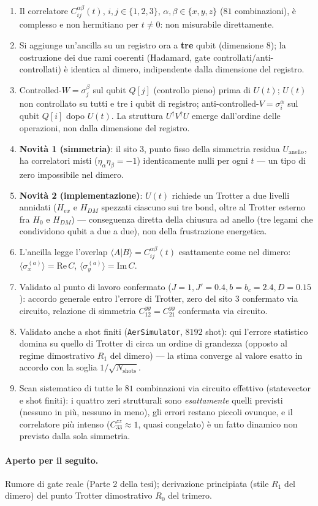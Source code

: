 \documentclass[11pt,a4paper]{article}
\begin{document}
\begin{enumerate}[leftmargin=*]
\item Il correlatore $C_{ij}^{\alpha\beta}(t)$, $i,j\in\{1,2,3\}$, $\alpha,\beta\in\{x,y,z\}$ ($81$
combinazioni), è complesso e non hermitiano per $t\neq0$: non misurabile direttamente.
\item Si aggiunge un'ancilla su un registro ora a \textbf{tre} qubit (dimensione $8$); la
costruzione dei due rami coerenti (Hadamard, gate controllati/anti-controllati) è identica al
dimero, indipendente dalla dimensione del registro.
\item Controlled-$W=\sigma_j^\beta$ sul qubit $Q[j]$ (controllo pieno) prima di $U(t)$;
$U(t)$ non controllato su tutti e tre i qubit di registro; anti-controlled-$V=\sigma_i^\alpha$ sul
qubit $Q[i]$ dopo $U(t)$. La struttura $U^\dagger V^\dagger U$ emerge dall'ordine delle operazioni,
non dalla dimensione del registro.
\item \textbf{Novità 1 (simmetria)}: il sito 3, punto fisso della simmetria residua
$U_\text{anello}$, ha correlatori misti ($\eta_\alpha\eta_\beta=-1$) identicamente nulli per ogni
$t$ --- un tipo di zero impossibile nel dimero.
\item \textbf{Novità 2 (implementazione)}: $U(t)$ richiede un Trotter a due livelli annidati
($H_{ex}$ e $H_{DM}$ spezzati ciascuno sui tre bond, oltre al Trotter esterno fra $H_0$ e
$H_{DM}$) --- conseguenza diretta della chiusura ad anello (tre legami che condividono qubit a due
a due), non della frustrazione energetica.
\item L'ancilla legge l'overlap $\langle A|B\rangle=C_{ij}^{\alpha\beta}(t)$ esattamente come nel
dimero: $\langle\sigma_x^{(a)}\rangle=\mathrm{Re}\,C$, $\langle\sigma_y^{(a)}\rangle=\mathrm{Im}\,C$.
\item Validato al punto di lavoro confermato ($J{=}1,J'{=}0.4,b{=}b_c{=}2.4,D{=}0.15$): accordo
generale entro l'errore di Trotter, zero del sito 3 confermato via circuito, relazione di
simmetria $C_{12}^{yy}=C_{21}^{yy}$ confermata via circuito.
\item Validato anche a shot finiti (\texttt{AerSimulator}, $8192$ shot): qui l'errore statistico
domina su quello di Trotter di circa un ordine di grandezza (opposto al regime dimostrativo
$R_1$ del dimero) --- la stima converge al valore esatto in accordo con la soglia
$1/\sqrt{N_{\text{shots}}}$.
\item Scan sistematico di tutte le $81$ combinazioni via circuito effettivo (statevector e shot
finiti): i quattro zeri strutturali sono \emph{esattamente} quelli previsti (nessuno in più,
nessuno in meno), gli errori restano piccoli ovunque, e il correlatore più intenso
($C_{33}^{zz}\approx1$, quasi congelato) è un fatto dinamico non previsto dalla sola simmetria.
\end{enumerate}

\paragraph{Aperto per il seguito.} Rumore di gate reale (Parte 2 della tesi); derivazione
principiata (stile $R_1$ del dimero) del punto Trotter dimostrativo $R_0$ del trimero.
\end{document}
